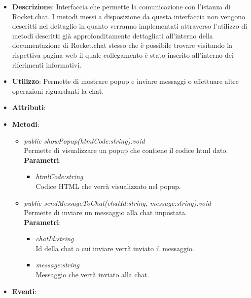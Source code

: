 \begin{itemize}
\item \textbf{Descrizione}: Interfaccia che permette la comunicazione con l'istanza di Rocket.chat.  I metodi messi a disposizione da questa interfaccia non vengono descritti nel dettaglio in quanto verranno implementati attraverso l'utilizzo di metodi descritti già approfonditamente dettagliati all'interno della documentazione di Rocket.chat stesso che è possibile trovare visitando la rispettiva pagina web il quale collegamento è stato inserito all'interno dei riferimenti informativi.
\item \textbf{Utilizzo}: Permette di mostrare popup e inviare messaggi o effettuare altre operazioni riguardanti la chat.
\item \textbf{Attributi}: 
\item \textbf{Metodi}:
	\begin{itemize}
	\item \textit{public showPopup(htmlCode:string):void}\\
	Permette di visualizzare un popup che contiene il codice html dato.
			\\\textbf{Parametri}: \begin{itemize}
			\item \textit{htmlCode:string}\\
				Codice HTML che verrà visualizzato nel popup.
			\end{itemize} 
			\item \textit{public sendMessageToChat(chatId:string, message:string):void}\\
			Permette di inviare un messaggio alla chat impostata.
			\\ \textbf{Parametri}: \begin{itemize}
			\item \textit{chatId:string}\\
			Id della chat a cui inviare verrà inviato il messaggio.
			\item \textit{message:string}\\
			Messaggio che verrà inviato alla chat.
\end{itemize} 
	\end{itemize}
\item \textbf{Eventi}:
\end{itemize}